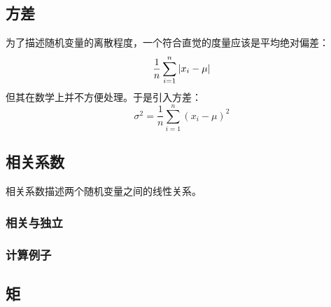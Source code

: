 \subsection{方差}
为了描述随机变量的离散程度，一个符合直觉的度量应该是平均绝对偏差：
\[
    \frac{1}{n} \sum_{i=1}^{n} \left|x_i - \mu\right|
\]
但其在数学上并不方便处理。于是引入方差：
\[
    \sigma^2 = \frac{1}{n} \sum_{i=1}^{n} (x_i - \mu)^2
\]
\subsection{相关系数}
相关系数描述两个随机变量之间的线性关系。
\subsubsection{相关与独立}
\subsubsection{计算例子}
\subsection{矩}

